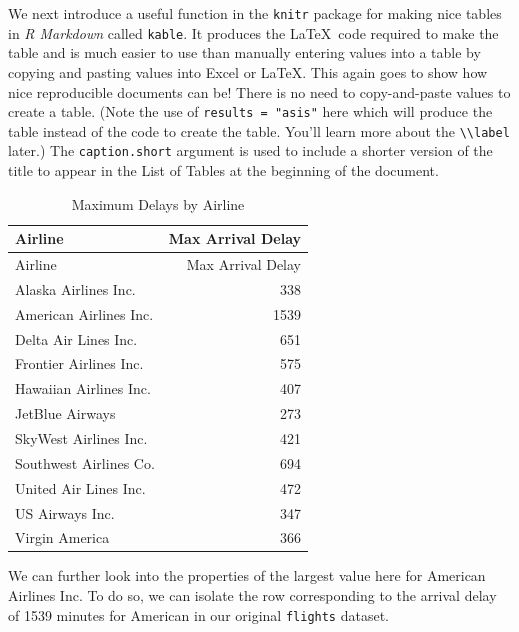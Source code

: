 \documentclass[12pt,twoside]{reedthesis}
\begin{document}
  We next introduce a useful function in the \texttt{knitr} package for
  making nice tables in \emph{R Markdown} called \texttt{kable}. It
  produces the \LaTeX~code required to make the table and is much easier
  to use than manually entering values into a table by copying and pasting
  values into Excel or \LaTeX. This again goes to show how nice
  reproducible documents can be! There is no need to copy-and-paste values
  to create a table. (Note the use of \texttt{results\ =\ "asis"} here
  which will produce the table instead of the code to create the table.
  You'll learn more about the
  \texttt{\textbackslash{}\textbackslash{}label} later.) The
  \texttt{caption.short} argument is used to include a shorter version of
  the title to appear in the List of Tables at the beginning of the
  document.
  
  \begin{Shaded}
  \begin{Highlighting}[]
   \NormalTok{(}\NormalTok{, }\NormalTok{),}
         \CharTok{\textbackslash{}\textbackslash{}}\NormalTok{,}
         \NormalTok{)}
  \end{Highlighting}
  \end{Shaded}
  
  \begin{longtable}[c]{@{}lr@{}}
  \caption{Maximum Delays by Airline \label{tab:max_delay}}\tabularnewline
  \toprule
  Airline & Max Arrival Delay\tabularnewline
  \midrule
  \endfirsthead
  \toprule
  Airline & Max Arrival Delay\tabularnewline
  \midrule
  \endhead
  Alaska Airlines Inc. & 338\tabularnewline
  American Airlines Inc. & 1539\tabularnewline
  Delta Air Lines Inc. & 651\tabularnewline
  Frontier Airlines Inc. & 575\tabularnewline
  Hawaiian Airlines Inc. & 407\tabularnewline
  JetBlue Airways & 273\tabularnewline
  SkyWest Airlines Inc. & 421\tabularnewline
  Southwest Airlines Co. & 694\tabularnewline
  United Air Lines Inc. & 472\tabularnewline
  US Airways Inc. & 347\tabularnewline
  Virgin America & 366\tabularnewline
  \bottomrule
  \end{longtable}
  
  We can further look into the properties of the largest value here for
  American Airlines Inc. To do so, we can isolate the row corresponding to
  the arrival delay of 1539 minutes for American in our original
  \texttt{flights} dataset.
  
\end{document}
